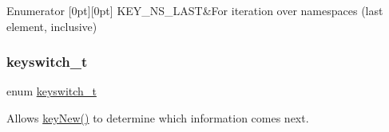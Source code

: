\begin{DoxyEnumFields}{Enumerator}
[0pt][0pt]{}\mbox{\label{group__key_ggaec3b8d6f430ae49b91bafe8a86310a68ad4d0f219a657517ddd50cd06c8190310}} 
K\+E\+Y\+\_\+\+N\+S\+\_\+\+L\+A\+ST&For iteration over namespaces (last element, inclusive) \\
\hline

\end{DoxyEnumFields}
\mbox{\label{group__key_ga91fb3178848bd682000958089abbaf40}} 
\subsubsection{\texorpdfstring{keyswitch\_t}{keyswitch\_t}}
{\footnotesize\ttfamily enum \mbox{\hyperlink{group__key_ga91fb3178848bd682000958089abbaf40}{keyswitch\+\_\+t}}}



Allows \mbox{\hyperlink{group__key_gad23c65b44bf48d773759e1f9a4d43b89}{key\+New()}} to determine which information comes next. 

